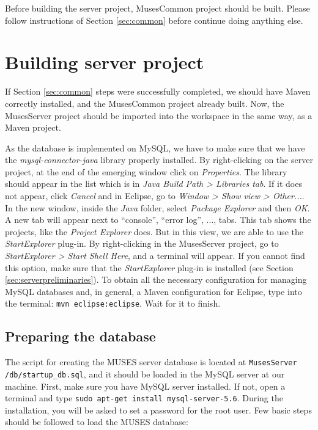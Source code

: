 Before building the server project, MusesCommon project should be built. Please follow instructions of Section \ref{sec:common} before continue doing anything else.

\section{Building server project}
\label{sec:buildserver}

If Section \ref{sec:common} steps were successfully completed, we should have Maven correctly installed, and the MusesCommon project already built. Now, the MusesServer project should be imported into the workspace in the same way, as a Maven project.

As the database is implemented on MySQL, we have to make sure that we have the \textit{mysql-connector-java} library properly installed. By right-clicking on the server project, at the end of the emerging window click on \textit{Properties}. The library should appear in the list which is in \textit{Java Build Path > Libraries tab}. If it does not appear, click \textit{Cancel} and in Eclipse, go to \textit{Window > Show view > Other...}. In the new window, inside the \textit{Java} folder, select \textit{Package Explorer} and then \textit{OK}. A new tab will appear next to ``console'', ``error log'', ..., tabs. This tab shows the projects, like the \textit{Project Explorer} does. But in this view, we are able to use the \textit{StartExplorer} plug-in. By right-clicking in the MusesServer project, go to \textit{StartExplorer > Start Shell Here}, and a terminal will appear. If you cannot find this option, make sure that the \textit{StartExplorer} plug-in is installed (see Section \ref{sec:serverpreliminaries}). To obtain all the necessary configuration for managing MySQL databases and, in general, a Maven configuration for Eclipse, type into the terminal: \texttt{mvn eclipse:eclipse}. Wait for it to finish.

\subsection{Preparing the database}
\label{subsec:database}

The script for creating the MUSES server database is located at \texttt{MusesServer\\/db/startup\_db.sql}, and it should be loaded in the MySQL server at our machine. First, make sure you have MySQL server installed. If not, open a terminal and type \texttt{sudo apt-get install mysql-server-5.6}. During the installation, you will be asked to set a password for the root user. Few basic steps \cite{mysqlguide:site} should be followed to load the MUSES database:

